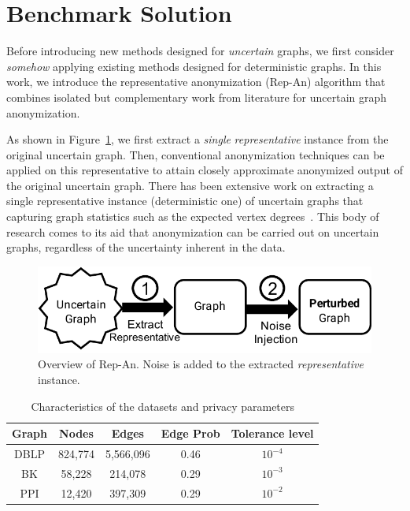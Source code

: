 \section{Benchmark Solution}
\label{sec:repOB}
Before introducing new methods designed for \emph{uncertain} graphs, we first consider \emph{somehow} applying existing methods designed for deterministic graphs. 
In this work, we introduce the representative anonymization (Rep-An) algorithm that combines isolated but complementary work from literature for uncertain graph anonymization. 

As shown in Figure~\ref{fig:repOB}, we first extract a \emph{single} \emph{representative} instance from the original uncertain graph. Then, conventional anonymization techniques can be applied on this representative to attain closely approximate anonymized output of the original uncertain graph. There has been extensive work on extracting a single representative instance (deterministic one) of uncertain graphs that capturing graph statistics such as the expected vertex degrees~\cite{Parchas_Gullo_Papadias_Bonchi_2014}. This body of research comes to its aid that anonymization can be carried out on uncertain graphs, regardless of the uncertainty inherent in the data. 

\begin{figure}[t]
  \vspace{-1em}
    \captionsetup{margin=0cm}
    \centering  
        \includegraphics[width=0.95\columnwidth]{AddFigure/repOB.pdf}
        \vspace{-0.7em}
      \caption{Overview of Rep-An. Noise is added to the extracted \emph{representative} instance.}
    \label{fig:repOB}
    \vspace{-0.5em}
\end{figure}

\begin{table}[t]
    \centering
        \caption{Characteristics of the datasets and privacy parameters}
        \begin{tabular}{|c|c|c|c||c|}
        \hline 
        Graph    & Nodes    & Edges    &Edge Prob    & Tolerance level\\
        \hline  
        DBLP     &824,774   &5,566,096 & 0.46        & $10^{-4}$\\
        BK       &58,228   & 214,078 &0.29 &$10^{-3}$ \\
        PPI      &12,420   & 397,309  & 0.29         &$10^{-2}$\\
        \hline
        \end{tabular}
        \label{tab:dataset}
\end{table}


